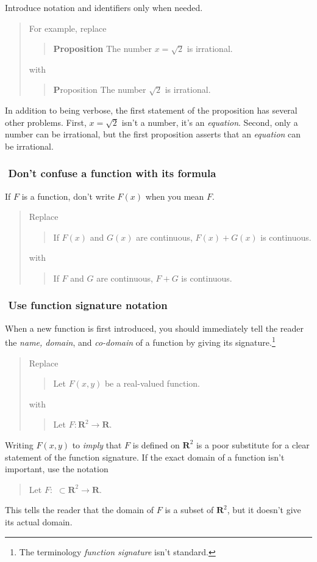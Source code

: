 \documentclass[12pt,fleqn]{article}
\newcounter{ex}\setcounter{ex}{0}
\newcommand{\ex}{%
\hspace{-0.2in} \setcounter{ex}{\value{ex}+1}
\theex \,\,}
\newcounter{id}\setcounter{id}{0}
\newcounter{se}\setcounter{se}{0}
\begin{document}
Introduce notation and identifiers only when needed. 
\begin{quote}
For example, replace
\begin{quote}
 \textbf {Proposition} The number \(x = \sqrt{2}\) is irrational.
\end{quote}
with
\begin{quote}
{ \textbf Proposition} The number \(\sqrt{2}\) is irrational.
\end{quote}
\end{quote}
In addition to being verbose, the first statement of the 
proposition has several other problems. First, \(x = \sqrt{2}\) isn't 
a number, it's an  {\em equation}. Second, only a number can be 
irrational, but the first proposition asserts that an {\em equation\/}
can be irrational. 

\subsubsection*{\ex  Don't confuse a function with its formula}

If \(F\) is a function, don't write \(F(x)\) when you mean \(F\).

\begin{quote}
Replace
\begin{quote}
If \(F(x) \) and \(G(x)\) are continuous, \(F(x) + G(x)\) is 
continuous.
\end{quote}
with
\begin{quote}
If \(F\) and \(G\) are continuous, \(F + G\) is 
continuous.
\end{quote}
\end{quote}

\subsubsection*{\ex  Use function signature notation}

When a new function is first introduced, you should  
immediately tell the reader the {\em name, domain}, and 
{\em co-domain\/} of a function by giving its signature.\footnote{The terminology {\em function signature\/} isn't
standard.}
\begin{quote}
Replace
\begin{quote}
Let \(F(x,y)\) be a real-valued function.
\end{quote}
with
\begin{quote}
Let \(F : \mathbf{R}^2 \to \mathbf{R}\).
\end{quote}
\end{quote}
Writing \(F(x,y)\) to {\em imply\/} that \(F\) is defined
on \( \mathbf{R}^2\) is a poor substitute for a clear statement of 
the function signature. If the exact domain of a function isn't 
important, use the notation
\begin{quote}
Let \(F :\,\, \subset \mathbf{R}^2 \to \mathbf{R}\).
\end{quote}
This tells the reader that the domain of \(F\) is a subset
of \(\mathbf{R}^2\), but it doesn't give its actual domain.
\end{document}
